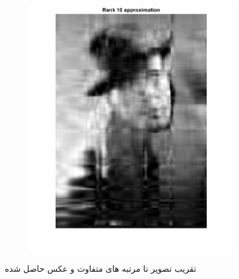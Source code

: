 \documentclass[12pt]{tehranReport}
\begin{document}
\begin{figure}[h!]
\begin{subfigure}{.55\textwidth}
			\includegraphics[width=\linewidth, height=\textheight,keepaspectratio]{pics/7}
			\label{fig:sub2}
		\end{subfigure}
		\caption{تقریب تصویر تا مرتبه های متفاوت و عکس حاصل شده}
		\label{fig:test}
	\end{figure}
\end{document}
